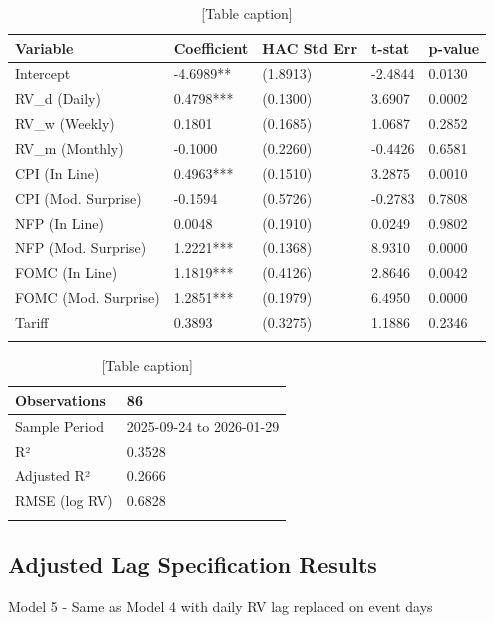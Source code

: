 \documentclass[12pt,a4paper]{report}
\begin{document}
\begin{table}[H]
\centering
\begin{tabular}{|l|l|l|l|l|}
\hline
Variable & Coefficient & HAC Std Err & t-stat & p-value \\
\hline
Intercept & -4.6989** & (1.8913) & -2.4844 & 0.0130 \\
\hline
RV_d (Daily) & 0.4798*** & (0.1300) & 3.6907 & 0.0002 \\
\hline
RV_w (Weekly) & 0.1801 & (0.1685) & 1.0687 & 0.2852 \\
\hline
RV_m (Monthly) & -0.1000 & (0.2260) & -0.4426 & 0.6581 \\
\hline
CPI (In Line) & 0.4963*** & (0.1510) & 3.2875 & 0.0010 \\
\hline
CPI (Mod. Surprise) & -0.1594 & (0.5726) & -0.2783 & 0.7808 \\
\hline
NFP (In Line) & 0.0048 & (0.1910) & 0.0249 & 0.9802 \\
\hline
NFP (Mod. Surprise) & 1.2221*** & (0.1368) & 8.9310 & 0.0000 \\
\hline
FOMC (In Line) & 1.1819*** & (0.4126) & 2.8646 & 0.0042 \\
\hline
FOMC (Mod. Surprise) & 1.2851*** & (0.1979) & 6.4950 & 0.0000 \\
\hline
Tariff & 0.3893 & (0.3275) & 1.1886 & 0.2346 \\
\hline
 &  &  &  &  \\
\hline
\end{tabular}
\caption{[Table caption]}
\end{table}
\begin{table}[H]
\centering
\begin{tabular}{|l|l|}
\hline
Observations & 86 \\
\hline
Sample Period & 2025-09-24 to 2026-01-29 \\
\hline
R² & 0.3528 \\
\hline
Adjusted R² & 0.2666 \\
\hline
RMSE (log RV) & 0.6828 \\
\hline
 &  \\
\hline
\end{tabular}
\caption{[Table caption]}
\end{table}
\subsection{Adjusted Lag Specification Results}
Model 5 - Same as Model 4 with daily RV lag replaced on event days
\end{document}
